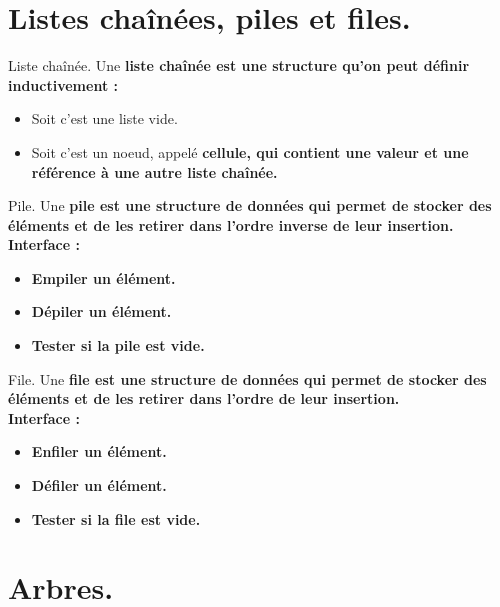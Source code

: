 \documentclass[french, 11pt]{article}
\begin{document}


\section{Listes chaînées, piles et files.}

\begin{defi}{Liste chaînée.}{}
    Une \bf{liste chaînée} est une structure qu'on peut définir inductivement :
    \begin{itemize}[topsep=0pt,itemsep=-0.9 ex]
        \item Soit c'est une liste vide.
        \item Soit c'est un noeud, appelé \bf{cellule}, qui contient une valeur et une référence à une autre liste chaînée.
    \end{itemize}
\end{defi}

\begin{defi}{Pile.}{}
    Une \bf{pile} est une structure de données qui permet de stocker des éléments et de les retirer dans l'ordre inverse de leur insertion.\\
    Interface :
    \begin{itemize}[topsep=0pt,itemsep=-0.9 ex]
        \item \bf{Empiler} un élément.
        \item \bf{Dépiler} un élément.
        \item \bf{Tester} si la pile est vide.
    \end{itemize}
\end{defi}

\begin{defi}{File.}{}
    Une \bf{file} est une structure de données qui permet de stocker des éléments et de les retirer dans l'ordre de leur insertion.\\
    Interface :
    \begin{itemize}[topsep=0pt,itemsep=-0.9 ex]
        \item \bf{Enfiler} un élément.
        \item \bf{Défiler} un élément.
        \item \bf{Tester} si la file est vide.
    \end{itemize}
\end{defi}

\section{Arbres.}
\end{document}
